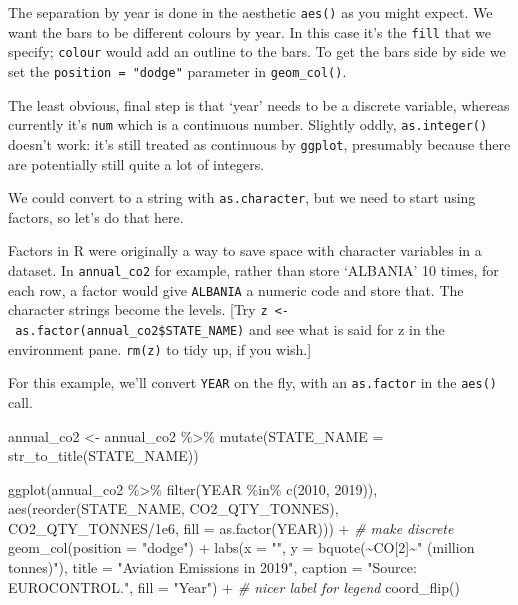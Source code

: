 \documentclass[
]{book}
\newenvironment{Shaded}{\begin{snugshade}}{\end{snugshade}}
\newcommand{\AttributeTok}[1]{\textcolor[rgb]{0.77,0.63,0.00}{#1}}
\newcommand{\CommentTok}[1]{\textcolor[rgb]{0.56,0.35,0.01}{\textit{#1}}}
\newcommand{\DecValTok}[1]{\textcolor[rgb]{0.00,0.00,0.81}{#1}}
\newcommand{\FloatTok}[1]{\textcolor[rgb]{0.00,0.00,0.81}{#1}}
\newcommand{\FunctionTok}[1]{\textcolor[rgb]{0.00,0.00,0.00}{#1}}
\newcommand{\NormalTok}[1]{#1}
\newcommand{\OtherTok}[1]{\textcolor[rgb]{0.56,0.35,0.01}{#1}}
\newcommand{\SpecialCharTok}[1]{\textcolor[rgb]{0.00,0.00,0.00}{#1}}
\newcommand{\StringTok}[1]{\textcolor[rgb]{0.31,0.60,0.02}{#1}}
\begin{document}
The separation by year is done in the aesthetic \texttt{aes()} as you might expect. We want the bars to be different colours by year. In this case it's the \texttt{fill} that we specify; \texttt{colour} would add an outline to the bars. To get the bars side by side we set the \texttt{position\ =\ "dodge"} parameter in \texttt{geom\_col()}.

The least obvious, final step is that `year' needs to be a discrete variable, whereas currently it's \texttt{num} which is a continuous number. Slightly oddly, \texttt{as.integer()} doesn't work: it's still treated as continuous by \texttt{ggplot}, presumably because there are potentially still quite a lot of integers.

We could convert to a string with \texttt{as.character}, but we need to start using factors, so let's do that here.

Factors in R were originally a way to save space with character variables in a dataset. In \texttt{annual\_co2} for example, rather than store `ALBANIA' 10 times, for each row, a factor would give \texttt{ALBANIA} a numeric code and store that. The character strings become the levels. {[}Try \texttt{z\ \textless{}-\ as.factor(annual\_co2\$STATE\_NAME)} and see what is said for z in the environment pane. \texttt{rm(z)} to tidy up, if you wish.{]}

For this example, we'll convert \texttt{YEAR} on the fly, with an \texttt{as.factor} in the \texttt{aes()} call.

\begin{Shaded}
\begin{Highlighting}[]
\NormalTok{annual\_co2 }\OtherTok{\textless{}{-}}\NormalTok{ annual\_co2 }\SpecialCharTok{\%\textgreater{}\%} 
  \FunctionTok{mutate}\NormalTok{(}\AttributeTok{STATE\_NAME =} \FunctionTok{str\_to\_title}\NormalTok{(STATE\_NAME))}

\FunctionTok{ggplot}\NormalTok{(annual\_co2 }\SpecialCharTok{\%\textgreater{}\%} 
         \FunctionTok{filter}\NormalTok{(YEAR }\SpecialCharTok{\%in\%} \FunctionTok{c}\NormalTok{(}\DecValTok{2010}\NormalTok{, }\DecValTok{2019}\NormalTok{)), }
       \FunctionTok{aes}\NormalTok{(}\FunctionTok{reorder}\NormalTok{(STATE\_NAME, CO2\_QTY\_TONNES),}
\NormalTok{           CO2\_QTY\_TONNES}\SpecialCharTok{/}\FloatTok{1e6}\NormalTok{,}
           \AttributeTok{fill =} \FunctionTok{as.factor}\NormalTok{(YEAR))) }\SpecialCharTok{+}  \CommentTok{\# make discrete}
  \FunctionTok{geom\_col}\NormalTok{(}\AttributeTok{position =} \StringTok{"dodge"}\NormalTok{) }\SpecialCharTok{+}
  \FunctionTok{labs}\NormalTok{(}\AttributeTok{x =} \StringTok{""}\NormalTok{, }
       \AttributeTok{y =} \FunctionTok{bquote}\NormalTok{(}\SpecialCharTok{\textasciitilde{}}\NormalTok{CO[}\DecValTok{2}\NormalTok{]}\SpecialCharTok{\textasciitilde{}}\StringTok{" (million tonnes)"}\NormalTok{),}
       \AttributeTok{title =} \StringTok{"Aviation Emissions in 2019"}\NormalTok{,}
       \AttributeTok{caption =} \StringTok{"Source: EUROCONTROL."}\NormalTok{,}
       \AttributeTok{fill =} \StringTok{"Year"}\NormalTok{) }\SpecialCharTok{+} \CommentTok{\# nicer label for legend}
  \FunctionTok{coord\_flip}\NormalTok{()}
\end{Highlighting}
\end{Shaded}
\end{document}
